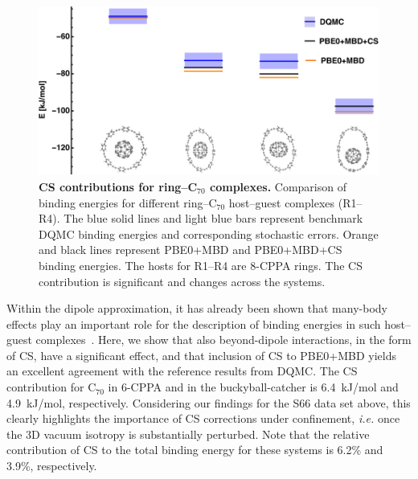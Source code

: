 \documentclass[aps,prl,groupaddress, twocolumn]{revtex4-1}  %
\begin{document}
\begin{figure}[hbtp]
\includegraphics[scale=1.]{Plots/Rings_new.pdf}
\caption{\textbf{CS contributions for ring--C$_{70}$ complexes.} Comparison of binding energies for different ring--C$_{70}$ host--guest complexes (R1--R4). The blue solid lines and light blue bars represent benchmark DQMC binding energies and corresponding stochastic errors. Orange and black lines represent PBE0+MBD and PBE0+MBD+CS binding energies. The hosts for R1--R4 are 8-CPPA rings. The CS contribution is significant and changes across the systems.}\label{fig:rings}
\end{figure}

Within the dipole approximation, it has already been shown that many-body effects play an important role for the description of binding energies in such host--guest complexes~\cite{hermann_ncomm2017}. Here, we show that also beyond-dipole interactions, in the form of CS, have a significant effect, and that inclusion of CS to PBE0+MBD yields an excellent agreement with the reference results from DQMC\@. The CS contribution for C$_{70}$ in 6-CPPA and in the buckyball-catcher is 6.4~kJ/mol and 4.9~kJ/mol, respectively. Considering our findings for the S66 data set above, this clearly highlights the importance of CS corrections under confinement, \textit{i.e.} once the 3D vacuum isotropy is substantially perturbed. Note that the relative contribution of CS to the total binding energy for these systems is 6.2\% and 3.9\%, respectively.
\end{document}
